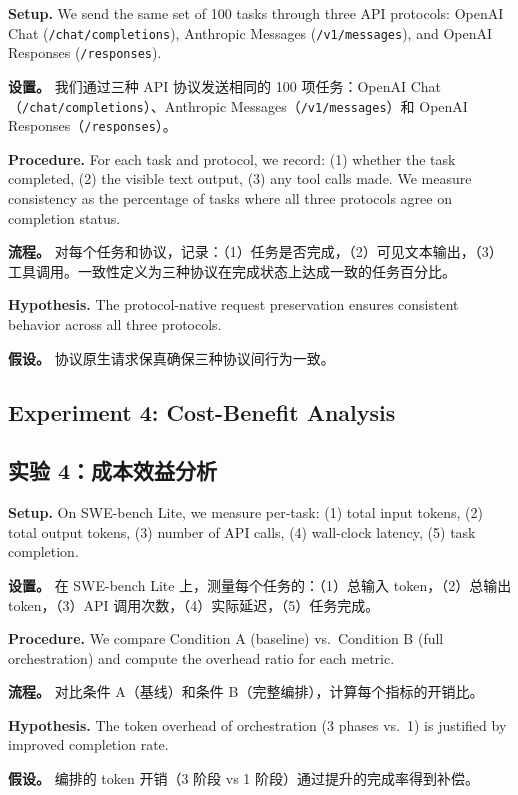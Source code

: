 \textbf{Setup.} We send the same set of 100 tasks through three API protocols: OpenAI Chat (\texttt{/chat/completions}), Anthropic Messages (\texttt{/v1/messages}), and OpenAI Responses (\texttt{/responses}).
\begin{chinese}
\textbf{设置。} 我们通过三种 API 协议发送相同的 100 项任务：OpenAI Chat（\texttt{/chat/completions}）、Anthropic Messages（\texttt{/v1/messages}）和 OpenAI Responses（\texttt{/responses}）。
\end{chinese}

\textbf{Procedure.} For each task and protocol, we record: (1) whether the task completed, (2) the visible text output, (3) any tool calls made. We measure consistency as the percentage of tasks where all three protocols agree on completion status.
\begin{chinese}
\textbf{流程。} 对每个任务和协议，记录：（1）任务是否完成，（2）可见文本输出，（3）工具调用。一致性定义为三种协议在完成状态上达成一致的任务百分比。
\end{chinese}

\textbf{Hypothesis.} The protocol-native request preservation ensures consistent behavior across all three protocols.
\begin{chinese}
\textbf{假设。} 协议原生请求保真确保三种协议间行为一致。
\end{chinese}

\subsection{Experiment 4: Cost-Benefit Analysis}
\begin{chinese}
\subsection*{实验 4：成本效益分析}
\end{chinese}

\textbf{Setup.} On SWE-bench Lite, we measure per-task: (1) total input tokens, (2) total output tokens, (3) number of API calls, (4) wall-clock latency, (5) task completion.
\begin{chinese}
\textbf{设置。} 在 SWE-bench Lite 上，测量每个任务的：（1）总输入 token，（2）总输出 token，（3）API 调用次数，（4）实际延迟，（5）任务完成。
\end{chinese}

\textbf{Procedure.} We compare Condition A (baseline) vs.\ Condition B (full orchestration) and compute the overhead ratio for each metric.
\begin{chinese}
\textbf{流程。} 对比条件 A（基线）和条件 B（完整编排），计算每个指标的开销比。
\end{chinese}

\textbf{Hypothesis.} The token overhead of orchestration (3 phases vs.\ 1) is justified by improved completion rate.
\begin{chinese}
\textbf{假设。} 编排的 token 开销（3 阶段 vs 1 阶段）通过提升的完成率得到补偿。
\end{chinese}
